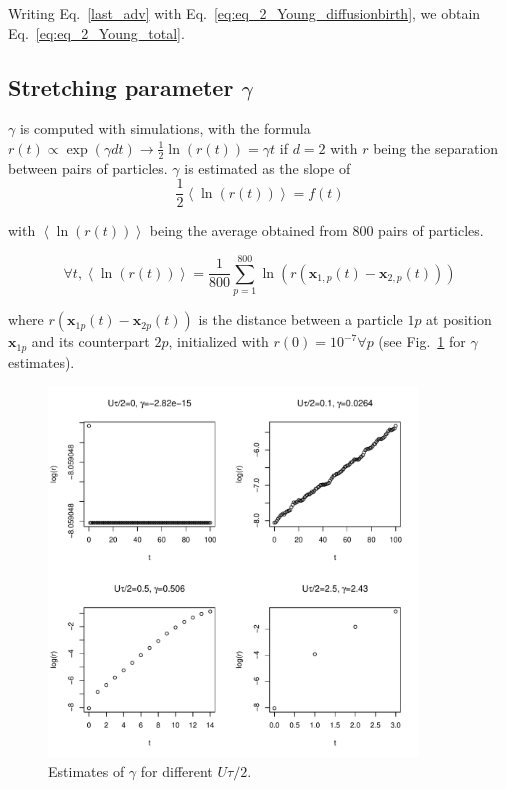 Writing Eq.~\ref{last_adv} with Eq.~\ref{eq:eq_2_Young_diffusionbirth}, we obtain Eq.~\ref{eq:eq_2_Young_total}. 

\subsection*{Stretching parameter $\gamma$}

$\gamma$ is computed with simulations, with the formula $r(t)\propto \exp(\gamma dt)\rightarrow\frac{1}{2}\ln(r(t))=\gamma t$
if $d=2$ with $r$ being the separation between pairs of particles. $\gamma$ is estimated as the slope of $$\frac{1}{2}\left\langle \ln(r(t))\right\rangle =f(t)$$

with $\left\langle \ln(r(t))\right\rangle $ being the average obtained from 800 pairs of particles. 

$$\forall t,\left\langle \ln(r(t))\right\rangle =\frac{1}{800}\sum_{p=1}^{800}\ln(r(\boldsymbol{x}_{1,p}(t)-\boldsymbol{x}_{2,p}(t)))$$ 

where $r(\boldsymbol{x}_{1p}(t)-\boldsymbol{x}_{2p}(t))$ is the distance between a particle $1p$ at position $\boldsymbol{x}_{1p}$ and its counterpart $2p$, initialized with $r(0)=10^{-7}\forall p$ (see Fig.~\ref{fig:gamma_Utot} for $\gamma$ estimates).

\begin{figure}[H]
\begin{centering}
\includegraphics[width=0.875\textwidth]{../code/figure/gamma_for_different_Utot.pdf}
\par\end{centering}
\caption{Estimates of $\gamma$ for different $U\tau/2$.\label{fig:gamma_Utot}}
\end{figure}

